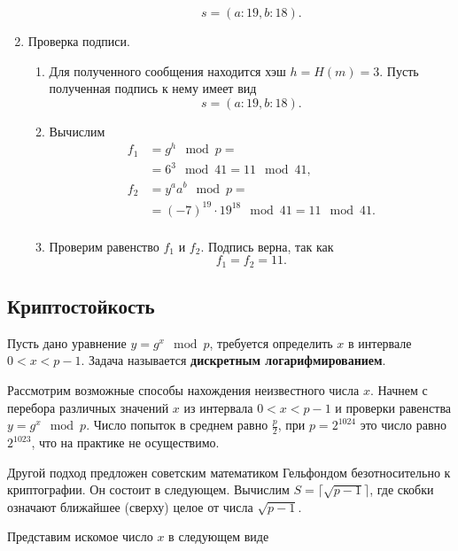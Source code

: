 \begin{enumerate}
\begin{enumerate}
                \[ s = (a:19, b:18). \]
        \end{enumerate}
    \item Проверка подписи.
        \begin{enumerate}
            \item Для полученного сообщения находится хэш $h = H(m) = 3$. Пусть полученная подпись к нему имеет вид
                \[ s = (a:19, b:18). \]
            \item Вычислим
                \[ \begin{array}{ll}
                    f_1 & = g^h \mod p = \\
                        & = 6^3 \mod 41 = 11 \mod 41, \\
                    f_2 & = y^a a^b \mod p = \\
                        & = (-7)^{19} \cdot 19^{18} \mod 41 = 11 \mod 41. \\
                \end{array} \]
            \item Проверим равенство $f_1$ и $f_2$. Подпись верна, так как
                \[ f_1 = f_2 = 11. \]
        \end{enumerate}
\end{enumerate}

\exampleend
{}

\subsection{Криптостойкость}

Пусть дано уравнение $y=g^{x} \mod p$, требуется определить $x$ в интервале $0 < x < p-1$. Задача называется \textbf{дискретным логарифмированием}.

Рассмотрим возможные способы нахождения неизвестного числа $x$. Начнем с перебора различных значений $x$ из интервала $0<x<p-1$ и проверки равенства $y=g^{x} \mod p$. Число попыток в среднем равно $\frac{p}{2}$, при $p=2^{1024}$ это число равно $2^{1023}$, что на практике не осуществимо.

Другой подход предложен советским математиком Гельфондом безотносительно к криптографии. Он состоит в следующем.
Вычислим $S=\lceil\sqrt{p-1}\rceil $, где скобки означают ближайшее (сверху) целое от числа $\sqrt{p-1} $.

Представим искомое число $x$   в следующем виде

